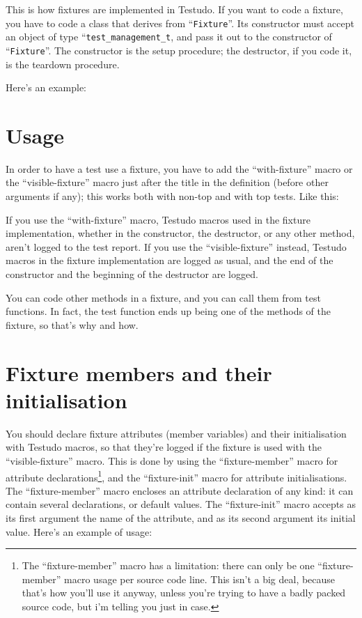 \documentclass[twoside, a4paper, article]{memoir}
\providecommand\typesetexample[1]{%
}
\begin{document}
This is how fixtures are implemented in Testudo.  If you want to code a
fixture, you have to code a class that derives from
``\texttt{Fixture}''.  Its constructor must accept an object of type
``\texttt{test\_management\_t}, and pass it out to the constructor of
``\texttt{Fixture}''.  The constructor is the setup procedure; the
destructor, if you code it, is the teardown procedure.

Here's an example:

\typesetexample{fixture-outatime-definition}

\section{Usage}
\label{sec:fixture-usage}

In order to have a test use a fixture, you have to add the ``with-fixture''
macro or the ``visible-fixture'' macro just after the title in the definition
(before other arguments if any); this works both with non-top and with top
tests.  Like this:

\typesetexample{fixture-outatime-test}

If you use the ``with-fixture'' macro, Testudo macros used in the fixture
implementation, whether in the constructor, the destructor, or any other
method, aren't logged to the test report.  If you use the ``visible-fixture''
instead, Testudo macros in the fixture implementation are logged as usual, and
the end of the constructor and the beginning of the destructor are logged.

You can code other methods in a fixture, and you can call them from test
functions.  In fact, the test function ends up being one of the methods of the
fixture, so that's why and how.

\section{Fixture members and their initialisation}
\label{sec:fixture-members-and-initialisation}

You should declare fixture attributes (member variables) and their
initialisation with Testudo macros, so that they're logged if the fixture is
used with the ``visible-fixture'' macro.  This is done by using the
``fixture-member'' macro for attribute declarations\footnote{The
  ``fixture-member'' macro has a limitation: there can only be one
  ``fixture-member'' macro usage per source code line.  This isn't a big deal,
  because that's how you'll use it anyway, unless you're trying to have a badly
  packed source code, but i'm telling you just in case.}, and the
``fixture-init'' macro for attribute initialisations.  The ``fixture-member''
macro encloses an attribute declaration of any kind: it can contain several
declarations, or default values.  The ``fixture-init'' macro accepts as its
first argument the name of the attribute, and as its second argument its
initial value.  Here's an example of usage:
\end{document}
